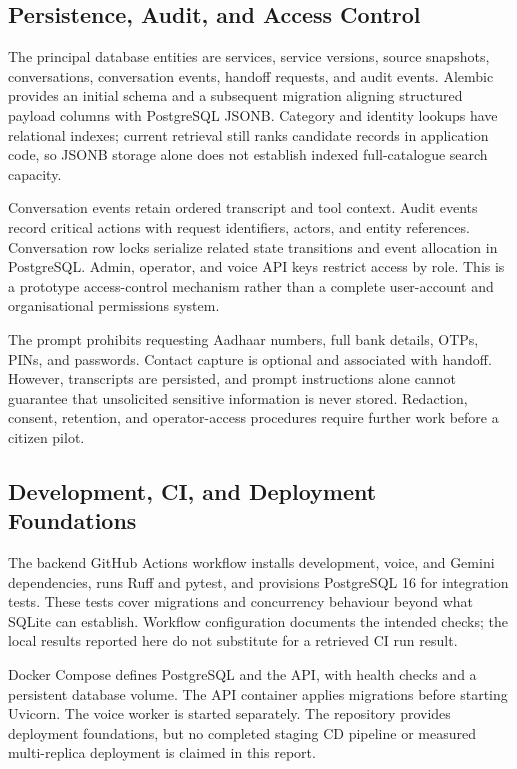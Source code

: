\documentclass[11pt,a4paper,oneside]{report}
\begin{document}
\subsection{Persistence, Audit, and Access Control}
The principal database entities are services, service versions, source snapshots,
conversations, conversation events, handoff requests, and audit events. Alembic
provides an initial schema and a subsequent migration aligning structured payload
columns with PostgreSQL JSONB. Category and identity lookups have relational
indexes; current retrieval still ranks candidate records in application code,
so JSONB storage alone does not establish indexed full-catalogue search capacity.

Conversation events retain ordered transcript and tool context. Audit events
record critical actions with request identifiers, actors, and entity references.
Conversation row locks serialize related state transitions and event allocation
in PostgreSQL. Admin, operator, and voice API keys restrict access by role.
This is a prototype access-control mechanism rather than a complete user-account
and organisational permissions system.

The prompt prohibits requesting Aadhaar numbers, full bank details, OTPs, PINs,
and passwords. Contact capture is optional and associated with handoff. However,
transcripts are persisted, and prompt instructions alone cannot guarantee that
unsolicited sensitive information is never stored. Redaction, consent, retention,
and operator-access procedures require further work before a citizen pilot.

\subsection{Development, CI, and Deployment Foundations}
The backend GitHub Actions workflow installs development, voice, and Gemini
dependencies, runs Ruff and pytest, and provisions PostgreSQL 16 for integration
tests. These tests cover migrations and concurrency behaviour beyond what SQLite
can establish. Workflow configuration documents the intended checks; the local
results reported here do not substitute for a retrieved CI run result.

Docker Compose defines PostgreSQL and the API, with health checks and a persistent
database volume. The API container applies migrations before starting Uvicorn.
The voice worker is started separately. The repository provides deployment
foundations, but no completed staging CD pipeline or measured multi-replica
deployment is claimed in this report.
\end{document}
